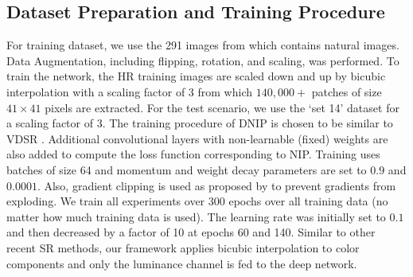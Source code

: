 \documentclass[9pt]{article}
\begin{document}
\subsection{Dataset Preparation and Training Procedure }
For training dataset, we use the 291 images from \cite{schulter2015fast} which contains natural images. Data Augmentation, including flipping, rotation, and scaling, was performed. To train the network, the HR training images are scaled down and up by bicubic interpolation with a scaling factor of $3$ from which $140,000+$ patches of size $41\times 41$ pixels are extracted. For the test scenario, we use the `set 14' \cite{Zeyde:SR_Springer2012} dataset for a scaling factor of $3$. The training procedure of DNIP is chosen to be similar to VDSR \cite{Kim_2016_VDSR}. Additional convolutional layers with non-learnable (fixed) weights are also added to compute the loss function corresponding to NIP. Training uses batches of size 64 and momentum and weight decay parameters are set to $0.9$ and $0.0001$. Also, gradient clipping is used as proposed by \cite{Kim_2016_VDSR} to prevent gradients from exploding. We train all experiments over 300 epochs over all training data (no matter how much training data is used). The learning rate was initially set to $0.1$ and then decreased by a factor of 10 at epochs 60 and 140. Similar to other recent SR methods, our framework applies bicubic interpolation to color components and only the luminance channel is fed to the deep network.
\end{document}
